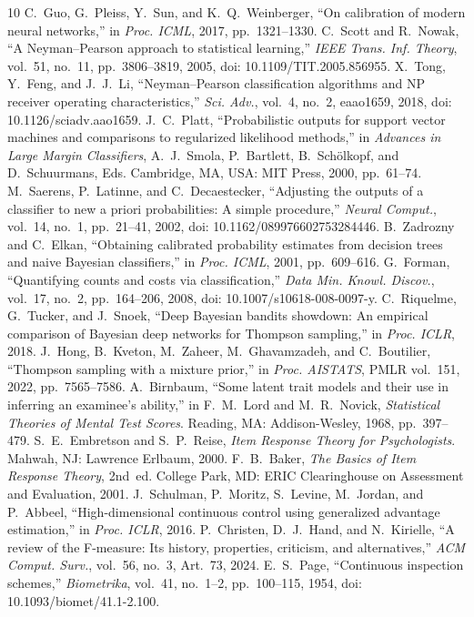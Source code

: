 \documentclass{ieeetj}
\begin{document}
\begin{thebibliography}{10}
 C.~Guo, G.~Pleiss, Y.~Sun, and K.~Q.~Weinberger, ``On calibration of modern neural networks,'' in \emph{Proc. ICML}, 2017, pp.~1321--1330.
 C.~Scott and R.~Nowak, ``A Neyman--Pearson approach to statistical learning,'' \emph{IEEE Trans. Inf. Theory}, vol.~51, no.~11, pp.~3806--3819, 2005, doi: 10.1109/TIT.2005.856955.
 X.~Tong, Y.~Feng, and J.~J.~Li, ``Neyman--Pearson classification algorithms and NP receiver operating characteristics,'' \emph{Sci. Adv.}, vol.~4, no.~2, eaao1659, 2018, doi: 10.1126/sciadv.aao1659.
 J.~C.~Platt, ``Probabilistic outputs for support vector machines and comparisons to regularized likelihood methods,'' in \emph{Advances in Large Margin Classifiers}, A.~J.~Smola, P.~Bartlett, B.~Sch\"olkopf, and D.~Schuurmans, Eds. Cambridge, MA, USA: MIT Press, 2000, pp.~61--74.
 M.~Saerens, P.~Latinne, and C.~Decaestecker, ``Adjusting the outputs of a classifier to new a priori probabilities: A simple procedure,'' \emph{Neural Comput.}, vol.~14, no.~1, pp.~21--41, 2002, doi: 10.1162/089976602753284446.
 B.~Zadrozny and C.~Elkan, ``Obtaining calibrated probability estimates from decision trees and naive Bayesian classifiers,'' in \emph{Proc. ICML}, 2001, pp.~609--616.
 G.~Forman, ``Quantifying counts and costs via classification,'' \emph{Data Min. Knowl. Discov.}, vol.~17, no.~2, pp.~164--206, 2008, doi: 10.1007/s10618-008-0097-y.
 C.~Riquelme, G.~Tucker, and J.~Snoek, ``Deep Bayesian bandits showdown: An empirical comparison of Bayesian deep networks for Thompson sampling,'' in \emph{Proc. ICLR}, 2018.
 J.~Hong, B.~Kveton, M.~Zaheer, M.~Ghavamzadeh, and C.~Boutilier, ``Thompson sampling with a mixture prior,'' in \emph{Proc. AISTATS}, PMLR vol.~151, 2022, pp.~7565--7586.
 A.~Birnbaum, ``Some latent trait models and their use in inferring an examinee's ability,'' in F.~M.~Lord and M.~R.~Novick, \emph{Statistical Theories of Mental Test Scores}. Reading, MA: Addison-Wesley, 1968, pp.~397--479.
 S.~E.~Embretson and S.~P.~Reise, \emph{Item Response Theory for Psychologists}. Mahwah, NJ: Lawrence Erlbaum, 2000.
 F.~B.~Baker, \emph{The Basics of Item Response Theory}, 2nd~ed. College Park, MD: ERIC Clearinghouse on Assessment and Evaluation, 2001.
 J.~Schulman, P.~Moritz, S.~Levine, M.~Jordan, and P.~Abbeel, ``High-dimensional continuous control using generalized advantage estimation,'' in \emph{Proc. ICLR}, 2016.
 P.~Christen, D.~J.~Hand, and N.~Kirielle, ``A review of the F-measure: Its history, properties, criticism, and alternatives,'' \emph{ACM Comput. Surv.}, vol.~56, no.~3, Art.~73, 2024.
 E.~S.~Page, ``Continuous inspection schemes,'' \emph{Biometrika}, vol.~41, no.~1--2, pp.~100--115, 1954, doi: 10.1093/biomet/41.1-2.100.
\end{thebibliography}
\end{document}
